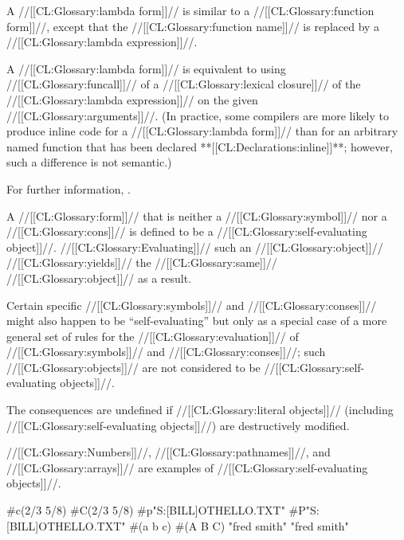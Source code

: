 \endsubsubsubsubsection%

 

A //[[CL:Glossary:lambda form]]// is similar to a //[[CL:Glossary:function form]]//, except that the //[[CL:Glossary:function name]]// is replaced by a //[[CL:Glossary:lambda expression]]//.

A //[[CL:Glossary:lambda form]]// is equivalent to using //[[CL:Glossary:funcall]]// of a //[[CL:Glossary:lexical closure]]// of the //[[CL:Glossary:lambda expression]]// on the given //[[CL:Glossary:arguments]]//. (In practice, some compilers are more likely to produce inline code  for a //[[CL:Glossary:lambda form]]// than for an arbitrary named function  that has been declared **[[CL:Declarations:inline]]**; however, such a difference is not semantic.)

For further information, \seesection\LambdaExpressions.

\endsubsubsubsubsection%

\endsubsubsubsection%


 A //[[CL:Glossary:form]]// that is neither a //[[CL:Glossary:symbol]]// nor a //[[CL:Glossary:cons]]// is  defined to be a //[[CL:Glossary:self-evaluating object]]//.  //[[CL:Glossary:Evaluating]]// such an //[[CL:Glossary:object]]// //[[CL:Glossary:yields]]// the //[[CL:Glossary:same]]// //[[CL:Glossary:object]]//  as a result.

Certain specific //[[CL:Glossary:symbols]]// and //[[CL:Glossary:conses]]// might also happen  to be ``self-evaluating'' but only as a special case of a more  general set of rules for the //[[CL:Glossary:evaluation]]// of //[[CL:Glossary:symbols]]// and //[[CL:Glossary:conses]]//; such //[[CL:Glossary:objects]]// are not considered to be //[[CL:Glossary:self-evaluating objects]]//.

The consequences are undefined if //[[CL:Glossary:literal objects]]// (including //[[CL:Glossary:self-evaluating objects]]//) are destructively modified.


//[[CL:Glossary:Numbers]]//, //[[CL:Glossary:pathnames]]//, and //[[CL:Glossary:arrays]]// are examples of //[[CL:Glossary:self-evaluating objects]]//.

 
 #c(2/3 5/8) \EV #C(2/3 5/8)
 #p"S:[BILL]OTHELLO.TXT" \EV #P"S:[BILL]OTHELLO.TXT"
 #(a b c) \EV #(A B C)
 "fred smith" \EV "fred smith" \endcode


